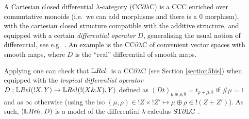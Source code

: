 A Cartesian closed differential $\lambda$-category (CC$\partial\lambda$C)\cite{Manzo2010,Blute2009, Blute2019} is a CCC enriched over commutative monoids (i.e.\ we can add morphisms and there is a $0$ morphism), with the cartesian closed structure compatible with the additive structure, 
and equipped with a certain \emph{differential operator} $D$, generalising the usual notion of differential, see e.g.\ \cite{BluteEhrhTass10}.
An example is the CC$\partial\lambda$C of convenient vector spaces with smooth maps, where $D$ is the ``real'' differential of smooth maps.

Applying \cite[Theorem 6.1]{lemay2020} one can check that
 $\LREL_!$ is a CC$\partial\lambda$C (see Section \ref{section5bis}) when equipped with the \emph{tropical differential operator} $D:\HOM{\LREL}{!X}{Y}\to \HOM{\LREL}{!(X\& X)}{Y}$ defined as $(Dt)_{\mu\oplus\rho,b}=t_{\rho+\mu,b}$ if $\#\mu=1$ and as $\infty$ otherwise (using the iso $(\mu,\rho)\in !Z\times !Z'\mapsto\mu\oplus\rho \in !(Z+Z')$).
As such, $(\LREL_!,D)$ is a model of the differential $\lambda$-calculus $\mathrm{ST}\partial\mathrm{LC}$ \cite{ER}.

